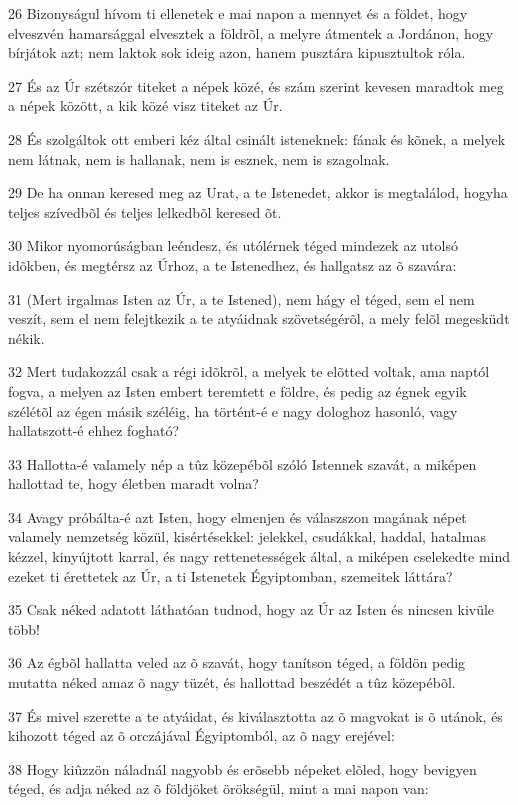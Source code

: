 \par 26 Bizonyságul hívom ti ellenetek e mai napon a mennyet és a földet, hogy elveszvén hamarsággal elvesztek a földrõl, a melyre átmentek a Jordánon, hogy bírjátok azt; nem laktok sok ideig azon, hanem pusztára kipusztultok róla.
\par 27 És az Úr szétszór titeket a népek közé, és szám szerint kevesen maradtok meg a népek között, a kik közé visz titeket az Úr.
\par 28 És szolgáltok ott emberi kéz által csinált isteneknek: fának és kõnek, a melyek nem látnak, nem is hallanak, nem is esznek, nem is szagolnak.
\par 29 De ha onnan keresed meg az Urat, a te Istenedet, akkor is megtalálod, hogyha teljes szívedbõl és teljes lelkedbõl keresed õt.
\par 30 Mikor nyomorúságban leéndesz, és utólérnek téged mindezek az utolsó idõkben, és megtérsz az Úrhoz, a te Istenedhez, és hallgatsz az õ szavára:
\par 31 (Mert irgalmas Isten az Úr, a te Istened), nem hágy el téged, sem el nem veszít, sem el nem felejtkezik a te atyáidnak szövetségérõl, a mely felõl megesküdt nékik.
\par 32 Mert tudakozzál csak a régi idõkrõl, a melyek te elõtted voltak, ama naptól fogva, a melyen az Isten embert teremtett e földre, és pedig az égnek egyik szélétõl az égen másik széléig, ha történt-é e nagy dologhoz hasonló, vagy hallatszott-é ehhez fogható?
\par 33 Hallotta-é valamely nép a tûz közepébõl szóló Istennek szavát, a miképen hallottad te, hogy életben maradt volna?
\par 34 Avagy próbálta-é azt Isten, hogy elmenjen és válaszszon magának népet valamely nemzetség közül, kisértésekkel: jelekkel, csudákkal, haddal, hatalmas kézzel, kinyújtott karral, és nagy rettenetességek által, a miképen cselekedte mind ezeket ti érettetek az Úr, a ti Istenetek Égyiptomban, szemeitek láttára?
\par 35 Csak néked adatott láthatóan tudnod, hogy az Úr az Isten és nincsen kivüle több!
\par 36 Az égbõl hallatta veled az õ szavát, hogy tanítson téged, a földön pedig mutatta néked amaz õ nagy tüzét, és hallottad beszédét a tûz közepébõl.
\par 37 És mivel szerette a te atyáidat, és kiválasztotta az õ magvokat is õ utánok, és kihozott téged az õ orczájával Égyiptomból, az õ nagy erejével:
\par 38 Hogy kiûzzön náladnál nagyobb és erõsebb népeket elõled, hogy bevigyen téged, és adja néked az õ földjöket örökségül, mint a mai napon van:

